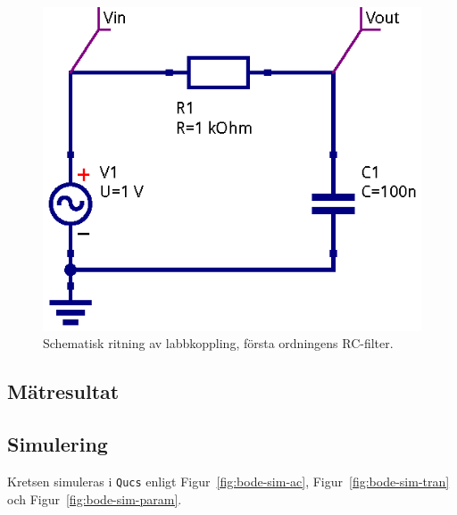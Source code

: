\begin{figure}
    \centering
    \includegraphics[width=0.8\linewidth]{sim/ee466_lab-4_prj/uppgift-0_schema}
    \caption[Schematisk ritning av labbkoppling, första ordningens RC-filter.]
    {Schematisk ritning av labbkoppling, första ordningens RC-filter.}
    \label{fig:rc-schema}
\end{figure}


\subsection{Mätresultat}\label{}

\subsection{Simulering}\label{}
Kretsen simuleras i \texttt{Qucs} enligt Figur~\ref{fig:bode-sim-ac},
Figur~\ref{fig:bode-sim-tran} och Figur~\ref{fig:bode-sim-param}.

